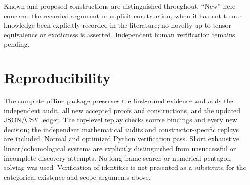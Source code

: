 \documentclass[11pt]{article}
\begin{document}
Known and proposed constructions are distinguished throughout. ``New'' here concerns
the recorded argument or explicit construction, when it has not to our knowledge
been explicitly recorded in the literature; no novelty up to tensor equivalence
or exoticness is asserted. Independent human verification remains pending.

\section{Reproducibility}
The complete offline package preserves the first-round evidence and adds the
independent audit, all new accepted proofs and constructions, and the updated
JSON/CSV ledger. The top-level replay checks source bindings and every new
decision; the independent mathematical audits and constructor-specific replays
are included. Normal and optimized Python verification pass. Short exhaustive
linear/cohomological systems are explicitly distinguished from unsuccessful or
incomplete discovery attempts. No long frame search or numerical pentagon solving
was used. Verification of identities is not presented as a substitute for the
categorical existence and scope arguments above.
\end{document}
